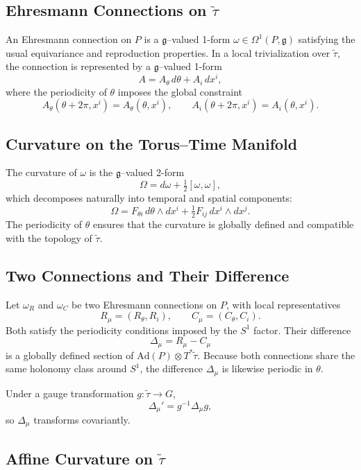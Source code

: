 \documentclass[12pt,openany]{book}
\theoremstyle{plain}
\theoremstyle{definition}
\theoremstyle{remark}
\begin{document}
\subsection*{Ehresmann Connections on $\tilde{\tau}$}

An Ehresmann connection on $P$ is a $\mathfrak{g}$--valued 1-form
$\omega \in \Omega^1(P,\mathfrak{g})$ satisfying the usual equivariance and
reproduction properties. In a local trivialization over $\tilde{\tau}$, the
connection is represented by a $\mathfrak{g}$--valued 1-form
\[
A = A_\theta\, d\theta + A_i\, dx^i,
\]
where the periodicity of $\theta$ imposes the global constraint
\[
A_\theta(\theta + 2\pi, x^i) = A_\theta(\theta, x^i),
\qquad
A_i(\theta + 2\pi, x^i) = A_i(\theta, x^i).
\]
\subsection*{Curvature on the Torus--Time Manifold}

The curvature of $\omega$ is the $\mathfrak{g}$--valued 2-form
\[
\Omega = d\omega + \tfrac{1}{2}[\omega,\omega],
\]
which decomposes naturally into temporal and spatial components:
\[
\Omega
= F_{\theta i}\, d\theta \wedge dx^i
+ \tfrac{1}{2} F_{ij}\, dx^i \wedge dx^j.
\]
The periodicity of $\theta$ ensures that the curvature is globally defined
and compatible with the topology of $\tilde{\tau}$.

\subsection*{Two Connections and Their Difference}

Let $\omega_R$ and $\omega_C$ be two Ehresmann connections on $P$, with
local representatives
\[
R_\mu = (R_\theta, R_i),
\qquad
C_\mu = (C_\theta, C_i).
\]
Both satisfy the periodicity conditions imposed by the $S^1$ factor. Their
difference
\[
\Delta_\mu = R_\mu - C_\mu
\]
is a globally defined section of $\mathrm{Ad}(P) \otimes T^*\tilde{\tau}$.
Because both connections share the same holonomy class around $S^1$, the
difference $\Delta_\mu$ is likewise periodic in $\theta$.

Under a gauge transformation $g : \tilde{\tau} \to G$,
\[
\Delta_\mu' = g^{-1} \Delta_\mu g,
\]
so $\Delta_\mu$ transforms covariantly.

\subsection*{Affine Curvature on $\tilde{\tau}$}
\end{document}

